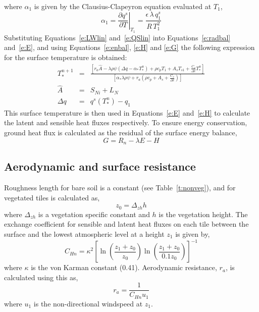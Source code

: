 \documentclass[a4paper]{article}
\begin{document}
where $\alpha_1$ is given by the Clausius-Clapeyron equation evaluated
at $T_1$,
\begin{equation}
  \alpha_1 = \left.\frac{\partial q^s}{\partial T} \right|_{T_1}
  =\frac{\epsilon \, \lambda \, q_1^s}{R \, T_1^2} \label{e:a1}
\end{equation}
Substituting Equations~\eqref{e:LWlin} and~\eqref{e:QSlin} into
Equations~\eqref{e:radbal} and~\eqref{e:E}, and using
Equations~\eqref{e:enbal}, \eqref{e:H} and \eqref{e:G} the following
expression for the surface temperature is obtained:
\begin{eqnarray}
  T_*^{n+1} &=& \frac{\left[r_a \hat{A} - \lambda \rho \psi \left(
               \Delta q - \alpha_* T_*^n \right) + \rho c_p T_1 + A_s
               T_{s1} + \frac{C_v}{\Delta t} T_*^n \right]}
               {\left[\alpha_* \lambda \rho \psi + r_a \left( \rho c_p +
               A_s + \frac{C_v}{\Delta t}\right) \right]}\label{e:T*} \\
  \hat{A} &=& S_{Ni} + L_N \label{e:Ahat} \\
  \Delta q &=& q^s(T_*^n) - q_1 \label{e:dq}
\end{eqnarray}
This surface temperature is then used in Equations~\eqref{e:E}
and~\eqref{e:H} to calculate the latent and sensible heat fluxes
respectively.  To ensure energy conservation, ground heat flux is
calculated as the residual of the surface energy balance,
\begin{equation}
  G = R_n - \lambda E - H \label{e:G2}
\end{equation}

\subsection{Aerodynamic and surface resistance}\label{s:surf.aero}
Roughness length for bare soil is a constant (see
Table~\ref{t:nonveg}), and for vegetated tiles is calculated as,
\begin{equation}
  z_0 = \Delta_{zh} h \label{e:z0}
\end{equation}
where $\Delta_{zh}$ is a vegetation specific constant and $h$ is the
vegetation height.  The exchange coefficient for sensible and latent
heat fluxes on each tile between the surface and the lowest
atmospheric level at a height $z_1$ is given by,
\begin{equation}
  C_{Hn} = \kappa^2 \left[ \ln\left(\frac{z_1+z_0}{z_0}\right)
  \ln\left(\frac{z_1+z_0}{0.1 z_0}\right)\right]^{-1} \label{e:chn}
\end{equation}
where $\kappa$ is the von Karman constant (0.41).  Aerodynamic
resistance, $r_a$, is calculated using this as,
\begin{equation}
  r_a = \frac{1}{C_{Hn}u_1} \label{e:ga}
\end{equation}
where $u_1$ is the non-directional windspeed at $z_1$.
\end{document}
